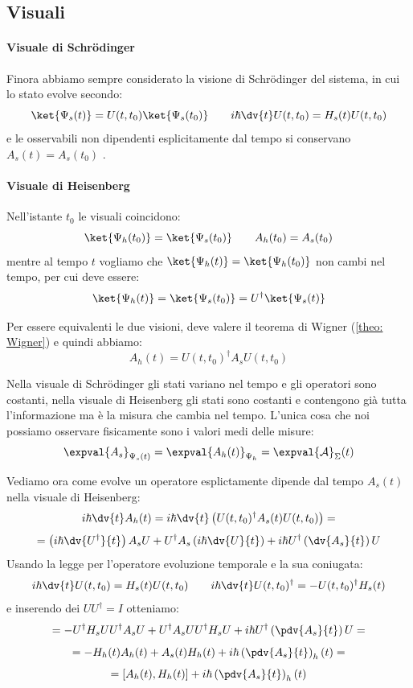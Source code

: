 
\subsection{Visuali}
\paragraph{Visuale di Schrödinger}Finora abbiamo sempre considerato la visione di Schrödinger del sistema, in cui lo stato evolve secondo:
\begin{equation}
    \ket{\Psi_s(t)} = U(t, t_0) \ket{\Psi_s(t_0)} \qquad i\hbar \dv{t}U(t, t_0)= H _s(t) U (t, t_0)
\end{equation}
e le osservabili non dipendenti esplicitamente dal tempo si conservano \(A_s(t)= A_s(t_0)\) .

\paragraph{Visuale di Heisenberg} Nell'istante \(t_0\) le visuali coincidono:
\[
    \ket{\Psi_h(t_0)} = \ket{\Psi_s(t_0)}   \qquad A_h(t_0)  = A_s(t_0)
\]
mentre al tempo \(t\) vogliamo che \(\ket{\Psi_h(t)}  = \ket{\Psi_h(t_0)}\) non cambi nel tempo, per cui deve essere:
\begin{equation}
    \ket{\Psi_h(t)}  = \ket{\Psi_s(t_0)} = U^\dagger \ket{\Psi_s(t)}
\end{equation}

Per essere equivalenti le due visioni, deve valere il teorema di Wigner (\ref{theo: Wigner}) e quindi abbiamo:
\begin{equation}
    A_h(t)= U(t,t_0)^\dagger A_s U (t, t_0)
\end{equation}

Nella visuale di Schrödinger gli stati variano nel tempo e gli operatori sono costanti, nella visuale di Heisenberg gli stati sono costanti e contengono già tutta l'informazione ma è la misura che cambia nel tempo.
L'unica cosa che noi possiamo osservare fisicamente sono i valori medi delle misure:
\begin{equation}
    \expval{A_s}_{\Psi_s(t)}  = \expval{A_h(t)}_{\Psi_h} = \expval{\mathcal{A}}_\Sigma(t)    
\end{equation}

Vediamo ora come evolve un operatore esplictamente dipende dal tempo \(A_s(t)\) nella visuale di Heisenberg:
\[
    i\hbar \dv{t} A_h(t)= i\hbar \dv{t} \left(U(t,t_0)^\dagger A_s(t)U(t,t_0)\right) =
\]
\[
    = \left(i\hbar\dv{ U^\dagger }{t}\right) A_s U + U^\dagger A_s \left(i\hbar\dv{U}{t}\right) + i\hbar U^\dagger \left( \dv{A_s}{t} \right)U 
\]
Usando la legge per l'operatore evoluzione temporale e la sua coniugata:
\[
    i\hbar \dv{t} U(t,t_0)= H_s(t)U(t, t_0) \qquad i\hbar \dv{t} U (t, t_0)^\dagger = - U(t, t_0)^\dagger H_s(t)
\]
e inserendo dei \(UU^\dagger = I\) otteniamo:
\[
    = - U ^\dagger H_s UU^\dagger A_s U +U^\dagger A_s U U^\dagger H_s U + i\hbar U^\dagger \left( \pdv{A_s}{t} \right)U =
\]
\[
    = - H_h(t) A_h(t)+ A_s(t)H_h  (t) + i\hbar \left( \pdv{A_s}{t} \right)_h(t)=
\]
\[
    =\left[ A_h(t), H_h(t) \right] + i\hbar \left( \pdv{A_s}{t} \right)_h(t)
\]

